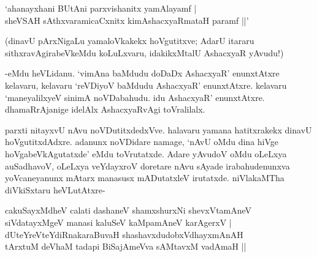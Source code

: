 \begin{shloka}
`ahanayxhani BUtAni parxvishanitx yamAlayamf |\\
sheVSAH sAthxvaramicaCxnitx kimAshacxyaRmataH paramf ||'
\end{shloka}

(dinavU pArxNigaLu yamaloVkakekx hoVgutitxve; AdarU itararu sithxravAgirabeVkeMdu koLuLxvaru, idakikxMtalU AshacxyaR yAvudu!)

-eMdu heVLidanu. `vimAna baMdudu doDaDx AshacxyaR' enunxtAtxre kelavaru, kelavaru `reVDiyoV baMdudu AshacxyaR' enunxtAtxre. kelavaru `maneyalilxyeV sinimA noVDabahudu. idu AshacxyaR' enunxtAtxre. dhamaRrAjanige idelAlx AshacxyaRvAgi toVralilalx.

parxti nitayxvU nAvu noVDutitxdedxVve. halavaru yamana hatitxrakekx dinavU hoVgutitxdAdxre. adanunx noVDidare namage, `nAvU oMdu dina hiVge hoVgabeVkAgutatxde' eMdu toVrutatxde. Adare yAvudoV oMdu oLeLxya auSadhavoV, oLeLxya veYdayxroV doretare nAvu sAyade irabahudenunxva yoVcaneyanunx mAtarx manasusx mADutatxleV irutatxde. niVlakaMTha diVkiSxtaru heVLutAtxre-

\begin{shloka}
cakuSayxMdheV calati dashaneV shamxshurxNi shevxVtamAneV\\
siVdatayxMgeV manasi kaluSeV kaMpamAneV karAgerxV |\\
dUteYreVteYdiRnakaraBuvaH shashavxdudobxVdhayxmAnAH\\
tArxtuM deVhaM tadapi BiSajAmeVva sAMtavxM vadAmaH ||
\end{shloka}

